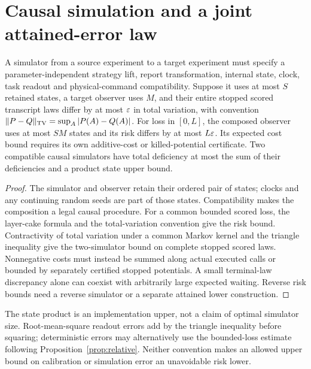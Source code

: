 \section{Causal simulation and a joint attained-error law}
\begin{proposition}\label{prop:simulation}
A simulator from a source experiment to a target experiment must specify a parameter-independent strategy lift, report transformation, internal state, clock, task readout and physical-command compatibility. Suppose it uses at most $S$ retained states, a target observer uses $M$, and their entire stopped scored transcript laws differ by at most $\varepsilon$ in total variation, with convention $\|P-Q\|_{\mathrm{TV}}=\sup_A|P(A)-Q(A)|$. For loss in $[0,L]$, the composed observer uses at most $SM$ states and its risk differs by at most $L\varepsilon$. Its expected cost bound requires its own additive-cost or killed-potential certificate. Two compatible causal simulators have total deficiency at most the sum of their deficiencies and a product state upper bound.
\end{proposition}
\begin{proof}
The simulator and observer retain their ordered pair of states; clocks and any continuing random seeds are part of those states. Compatibility makes the composition a legal causal procedure. For a common bounded scored loss, the layer-cake formula and the total-variation convention give the risk bound. Contractivity of total variation under a common Markov kernel and the triangle inequality give the two-simulator bound on complete stopped scored laws. Nonnegative costs must instead be summed along actual executed calls or bounded by separately certified stopped potentials. A small terminal-law discrepancy alone can coexist with arbitrarily large expected waiting. Reverse risk bounds need a reverse simulator or a separate attained lower construction.
\end{proof}

The state product is an implementation upper, not a claim of optimal simulator size. Root-mean-square readout errors add by the triangle inequality before squaring; deterministic errors may alternatively use the bounded-loss estimate following Proposition~\ref{prop:relative}. Neither convention makes an allowed upper bound on calibration or simulation error an unavoidable risk lower.

